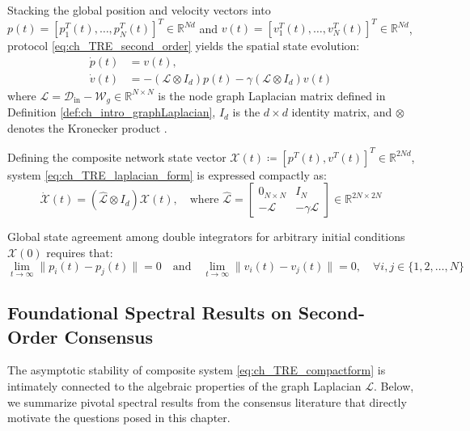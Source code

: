 Stacking the global position and velocity vectors into $p(t) = [p_1^T(t), \dots, p_N^T(t)]^T \in \mathbb{R}^{Nd}$ and $v(t) = [v_1^T(t), \dots, v_N^T(t)]^T \in \mathbb{R}^{Nd}$, protocol \eqref{eq:ch_TRE_second_order} yields the spatial state evolution:
\begin{equation}\label{eq:ch_TRE_laplacian_form}
	\begin{aligned}
		\dot{p}(t) &= v(t), \\
		\dot{v}(t) &= -(\mathcal{L} \otimes I_d) p(t) - \gamma (\mathcal{L} \otimes I_d) v(t)
	\end{aligned}	
\end{equation}
where $\mathcal{L} = \mathcal{D}_{\text{in}} - \mathcal{W}_g \in \mathbb{R}^{N \times N}$ is the node graph Laplacian matrix defined in Definition \ref{def:ch_intro_graphLaplacian}, $I_d$ is the $d \times d$ identity matrix, and $\otimes$ denotes the Kronecker product \cite{horn2012matrix}.

Defining the composite network state vector $\mathcal{X}(t) \coloneqq [p^T(t), v^T(t)]^T \in \mathbb{R}^{2Nd}$, system \eqref{eq:ch_TRE_laplacian_form} is expressed compactly as:
\begin{equation}\label{eq:ch_TRE_compactform}
	\dot{\mathcal{X}}(t) = (\hat{\mathcal{L}} \otimes I_d) \mathcal{X}(t), \quad \text{where } \hat{\mathcal{L}} = \begin{bmatrix} 0_{N \times N} & I_N \\ -\mathcal{L} & -\gamma \mathcal{L} \end{bmatrix} \in \mathbb{R}^{2N \times 2N}
\end{equation}

Global state agreement among double integrators for arbitrary initial conditions $\mathcal{X}(0)$ requires that:
\begin{equation}\label{eq:ch_TRE_secondconsensusdef}
	\lim_{t \to \infty} \|p_i(t) - p_j(t)\| = 0 \quad \text{and} \quad \lim_{t \to \infty} \|v_i(t) - v_j(t)\| = 0, \quad \forall i, j \in \{1, 2, \dots, N\}
\end{equation}

\subsection{Foundational Spectral Results on Second-Order Consensus}
The asymptotic stability of composite system \eqref{eq:ch_TRE_compactform} is intimately connected to the algebraic properties of the graph Laplacian $\mathcal{L}$. Below, we summarize pivotal spectral results from the consensus literature that directly motivate the questions posed in this chapter.


